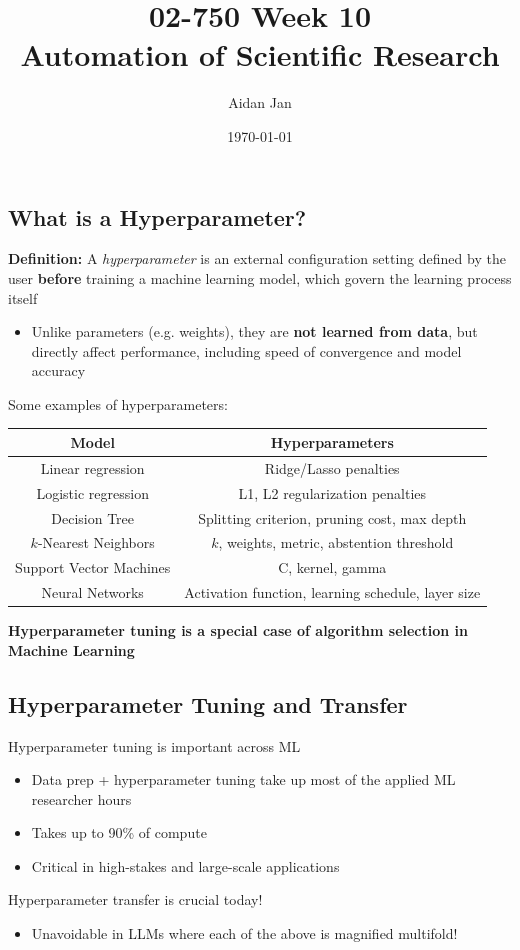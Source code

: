 \documentclass[10pt]{article}
\title{02-750 Week 10 \\ \large{Automation of Scientific Research}}
\author{Aidan Jan}
\date{\today}
\begin{document}
\maketitle

\subsection*{What is a Hyperparameter?}
\textbf{Definition:} A \textit{hyperparameter} is an external configuration setting defined by the user \textbf{before} training a machine learning model, which govern the learning process itself
\begin{itemize}
	\item Unlike parameters (e.g. weights), they are \textbf{not learned from data}, but directly affect performance, including speed of convergence and model accuracy
\end{itemize}
Some examples of hyperparameters:
\begin{center}
\begin{tabular}{|c|c|}
    \hline
    \textbf{Model} & \textbf{Hyperparameters} \\ \hline
    Linear regression & Ridge/Lasso penalties \\
    Logistic regression & L1, L2 regularization penalties \\
    Decision Tree & Splitting criterion, pruning cost, max depth \\
    $k$-Nearest Neighbors & $k$, weights, metric, abstention threshold \\
    Support Vector Machines & C, kernel, gamma \\
    Neural Networks & Activation function, learning schedule, layer size \\ \hline
\end{tabular}
\end{center}
\textbf{Hyperparameter tuning is a special case of algorithm selection in Machine Learning}

\subsection*{Hyperparameter Tuning and Transfer}
Hyperparameter tuning is important across ML
\begin{itemize}
	\item Data prep + hyperparameter tuning take up most of the applied ML researcher hours
	\item Takes up to 90\% of compute
	\item Critical in high-stakes and large-scale applications
\end{itemize}
Hyperparameter transfer is crucial today!
\begin{itemize}
	\item Unavoidable in LLMs where each of the above is magnified multifold!
\end{itemize}
\end{document}
